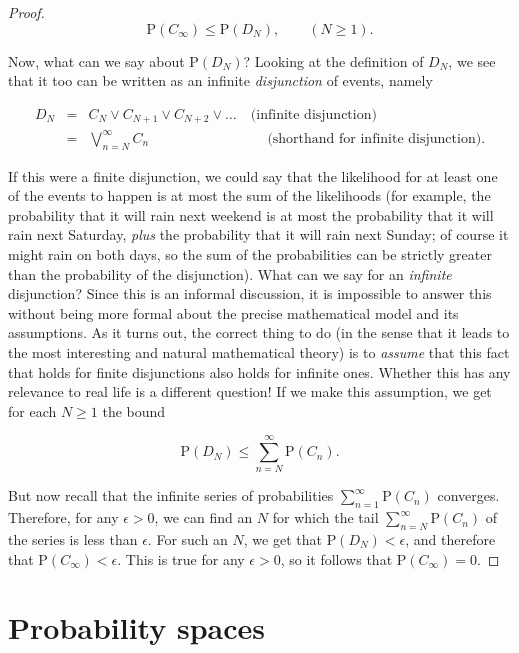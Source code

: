 \documentclass[11pt]{report}
\theoremstyle{plain}
\theoremstyle{definition}
\begin{document}
\begin{proof}
\[
\mathrm{P}(C_\infty) \le \mathrm{P}(D_N), \qquad (N\ge 1).
\]

\noindent Now, what can we say about $\mathrm{P}(D_N)$? Looking
at the definition of $D_N$, we see that it too can be
written as an infinite \emph{disjunction} of events, namely

\begin{eqnarray*}
D_N &=& C_N \vee C_{N+1} \vee C_{N+2} \vee \ldots \quad \textrm{(infinite disjunction)} \\
&=& \bigvee_{n=N}^\infty C_n \qquad\qquad\qquad\qquad\ \  \textrm{(shorthand for infinite disjunction)}.
\end{eqnarray*}

\noindent If this were a finite disjunction, we could say that
the likelihood for at least one of the events to
happen is at most the sum of the likelihoods (for
example, the probability that it will rain next
weekend is at most the probability that it will rain
next Saturday, \emph{plus} the probability that it will
rain next Sunday; of course it might rain on both
days, so the sum of the probabilities can be strictly
greater than the probability of the disjunction). What
can we say for an \emph{infinite} disjunction? Since this
is an informal discussion, it is impossible to answer
this without being more formal about the precise
mathematical model and its assumptions. As it turns
out, the correct thing to do (in the sense that it
leads to the most interesting and natural mathematical
theory) is to \emph{assume} that this fact that holds for
finite disjunctions also holds for infinite ones.
Whether this has any relevance to real life is a
different question! If we make this assumption, we get
for each $N\ge 1$ the bound

\[
\mathrm{P}(D_N) \le \sum_{n=N}^\infty \mathrm{P}(C_n).
\]

\noindent But now recall that the infinite series of
probabilities $\sum_{n=1}^\infty \mathrm{P}(C_n)$
converges. Therefore, for any $\epsilon>0$, we can
find an $N$ for which the tail
$\sum_{n=N}^\infty \mathrm{P}(C_n)$ of the series is
less than $\epsilon$. For such an $N$, we get that
$\mathrm{P}(D_N)< \epsilon$, and therefore that
$\mathrm{P}(C_\infty)<\epsilon$. This is true for any
$\epsilon>0$, so it follows that
$\mathrm{P}(C_\infty)=0$.
\end{proof}

\chapter{Probability spaces}
\end{document}
